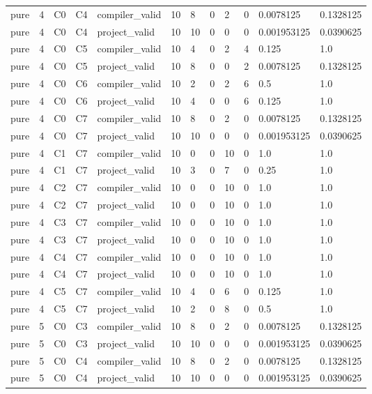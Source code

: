\begin{tabular}{llllllllllll}
pure & 4 & C0 & C4 & compiler\_valid & 10 & 8 & 0 & 2 & 0 & 0.0078125 & 0.1328125 \\
pure & 4 & C0 & C4 & project\_valid & 10 & 10 & 0 & 0 & 0 & 0.001953125 & 0.0390625 \\
pure & 4 & C0 & C5 & compiler\_valid & 10 & 4 & 0 & 2 & 4 & 0.125 & 1.0 \\
pure & 4 & C0 & C5 & project\_valid & 10 & 8 & 0 & 0 & 2 & 0.0078125 & 0.1328125 \\
pure & 4 & C0 & C6 & compiler\_valid & 10 & 2 & 0 & 2 & 6 & 0.5 & 1.0 \\
pure & 4 & C0 & C6 & project\_valid & 10 & 4 & 0 & 0 & 6 & 0.125 & 1.0 \\
pure & 4 & C0 & C7 & compiler\_valid & 10 & 8 & 0 & 2 & 0 & 0.0078125 & 0.1328125 \\
pure & 4 & C0 & C7 & project\_valid & 10 & 10 & 0 & 0 & 0 & 0.001953125 & 0.0390625 \\
pure & 4 & C1 & C7 & compiler\_valid & 10 & 0 & 0 & 10 & 0 & 1.0 & 1.0 \\
pure & 4 & C1 & C7 & project\_valid & 10 & 3 & 0 & 7 & 0 & 0.25 & 1.0 \\
pure & 4 & C2 & C7 & compiler\_valid & 10 & 0 & 0 & 10 & 0 & 1.0 & 1.0 \\
pure & 4 & C2 & C7 & project\_valid & 10 & 0 & 0 & 10 & 0 & 1.0 & 1.0 \\
pure & 4 & C3 & C7 & compiler\_valid & 10 & 0 & 0 & 10 & 0 & 1.0 & 1.0 \\
pure & 4 & C3 & C7 & project\_valid & 10 & 0 & 0 & 10 & 0 & 1.0 & 1.0 \\
pure & 4 & C4 & C7 & compiler\_valid & 10 & 0 & 0 & 10 & 0 & 1.0 & 1.0 \\
pure & 4 & C4 & C7 & project\_valid & 10 & 0 & 0 & 10 & 0 & 1.0 & 1.0 \\
pure & 4 & C5 & C7 & compiler\_valid & 10 & 4 & 0 & 6 & 0 & 0.125 & 1.0 \\
pure & 4 & C5 & C7 & project\_valid & 10 & 2 & 0 & 8 & 0 & 0.5 & 1.0 \\
pure & 5 & C0 & C3 & compiler\_valid & 10 & 8 & 0 & 2 & 0 & 0.0078125 & 0.1328125 \\
pure & 5 & C0 & C3 & project\_valid & 10 & 10 & 0 & 0 & 0 & 0.001953125 & 0.0390625 \\
pure & 5 & C0 & C4 & compiler\_valid & 10 & 8 & 0 & 2 & 0 & 0.0078125 & 0.1328125 \\
pure & 5 & C0 & C4 & project\_valid & 10 & 10 & 0 & 0 & 0 & 0.001953125 & 0.0390625 \\

\end{tabular}
